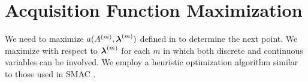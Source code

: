 \section{Acquisition Function Maximization}
\label{app:acquisition_function}


%
We need to maximize $a(A^{(m)}, \boldsymbol{\lambda}^{(m)})$ defined in  to determine the next point.
%
We maximize with respect to $\boldsymbol{\lambda}^{(m)}$ for each $m$ in which both discrete and continuous variables can be involved.
%
We employ a heuristic optimization algorithm similar to those used in SMAC \cite{hutter2011sequential}.


